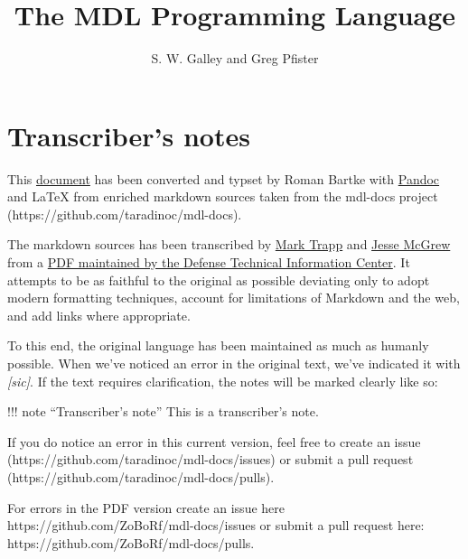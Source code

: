 \documentclass[a4paper]{scrbook}
\date{}
\begin{document}
\title{The MDL Programming Language}\label{the-mdl-programming-language}

\author{S. W. Galley and Greg Pfister}
\lowertitleback{Version of PDF conversion: 1.1\\
Date: 2020-09-03 10:25:00}
\publishers{Laboratory for Computer Science\\
Massachusetts Institute of Technology\\
\ \\
Cambridge\hfill Massachusetts 02139}
\maketitle
\tableofcontents{}


\section*{Transcriber's notes}\label{transcribers-notes}


This \href{https://github.com/ZoBoRf/mdl-docs}{document} has been converted and typset by Roman Bartke with
\href{https://pandoc.org/}{Pandoc} and \LaTeX{} from enriched markdown sources taken from the mdl-docs project
(https://github.com/taradinoc/mdl-docs).

The markdown sources has been transcribed by \href{https://marktrapp.com}{Mark Trapp} and
\href{https://bitbucket.org/jmcgrew}{Jesse McGrew} from a \href{http://www.dtic.mil/docs/citations/ADA070930}{PDF
maintained by the Defense Technical Information Center}. It attempts to be as faithful to the original as possible
deviating only to adopt modern formatting techniques, account for limitations of Markdown and the web, and add links where
appropriate.

To this end, the original language has been maintained as much as humanly possible. When we've noticed an error in the
original text, we've indicated it with \emph{{[}sic{]}}. If the text requires clarification, the notes will be marked
clearly like so:

!!! note ``Transcriber's note'' This is a transcriber's note.

If you do notice an error in this current version, feel free to create an issue
(https://github.com/taradinoc/mdl-docs/issues) or submit a pull request (https://github.com/taradinoc/mdl-docs/pulls).

For errors in the PDF version create an issue here https://github.com/ZoBoRf/mdl-docs/issues or submit a pull request here:
https://github.com/ZoBoRf/mdl-docs/pulls.
\end{document}
